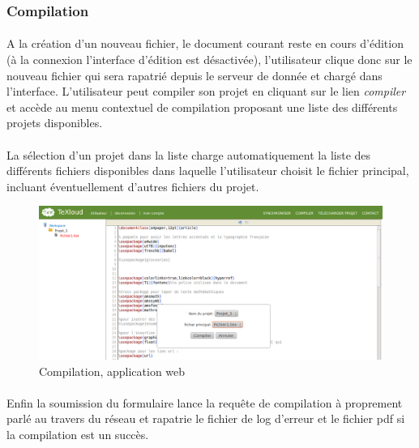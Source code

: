 \documentclass[a4paper,12pt]{article}
\begin{document}
\subsubsection{Compilation}
\paragraph*{}
A la création d'un nouveau fichier, le document courant reste en cours d'édition (à la connexion l'interface d'édition est désactivée), l'utilisateur clique donc sur le nouveau fichier qui sera rapatrié depuis le serveur de donnée et chargé dans l'interface.
L'utilisateur peut compiler son projet en cliquant sur le lien \emph{compiler} et accède au menu contextuel de compilation proposant une liste des différents projets disponibles.

\clearpage
\paragraph*{}
La sélection d'un projet dans la liste charge automatiquement la liste des différents fichiers disponibles dans laquelle l'utilisateur choisit le fichier principal, incluant éventuellement d'autres fichiers du projet.

\begin{figure}[!ht]
\begin{center}
  \includegraphics[width=1\textwidth]{./images/screenshot/Compiler.png}
\end{center}
  \caption{Compilation, application web}
  \label{compilation}
\end{figure}

\paragraph*{}
Enfin la soumission du formulaire lance la requête de compilation à proprement parlé au travers du réseau et rapatrie le fichier de log d'erreur et le fichier pdf si la compilation est un succès.
\end{document}
